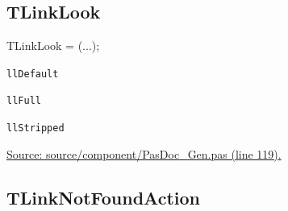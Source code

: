 \documentclass{report}
\newif\ifpdf
\begin{document}
\subsection*{TLinkLook}
\fi
\label{PasDoc_Gen-TLinkLook}
\begin{list}{}{
\setlength{\itemindent}{0cm}
\setlength{\listparindent}{0cm}
\setlength{\leftmargin}{\evensidemargin}
\addtolength{\leftmargin}{\tmplength}
\settowidth{\labelsep}{X}
\addtolength{\leftmargin}{\labelsep}
\setlength{\labelwidth}{\tmplength}
}
\item[\textbf{Declaration}\hfill]
\ifpdf
\begin{flushleft}
\fi
\begin{ttfamily}
TLinkLook = (...);\end{ttfamily}

\ifpdf
\end{flushleft}
\fi

\par
\item[\textbf{Description}]
 \item[\textbf{Values}]
\begin{description}
\item[\texttt{llDefault}] \label{PasDoc_Gen-llDefault}
\index{}
 
\item[\texttt{llFull}] \label{PasDoc_Gen-llFull}
\index{}
 
\item[\texttt{llStripped}] \label{PasDoc_Gen-llStripped}
\index{}
 
\end{description}
\par
\href{https://github.com/pasdoc/pasdoc/blob/master/source/component/PasDoc_Gen.pas#L119}{Source: source/component/PasDoc{\_}Gen.pas (line 119).}

\end{list}
\ifpdf
\subsection*{\large{\textbf{TLinkNotFoundAction}}\normalsize\hspace{1ex}\hrulefill}
\else
\end{document}

